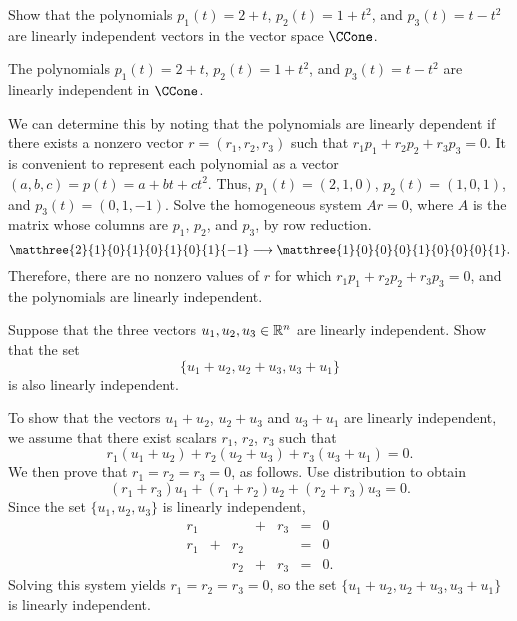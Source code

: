 \documentclass{article}
\begin{document}



\problemlabel

\begin{exercise} \label{c5.4.5}
Show that the polynomials $p_1(t) = 2+t$, $p_2(t) = 1+t^2$, and
$p_3(t) = t-t^2$ are linearly independent vectors in the vector
space $\CCone$.

\begin{solution}

\ans The polynomials $p_1(t) = 2 + t$, $p_2(t) = 1 + t^2$, and $p_3(t) =
t - t^2$ are linearly independent in $\CCone$.  

\soln We can determine this
by noting that the polynomials are linearly dependent if there exists
a nonzero vector $r = (r_1,r_2,r_3)$ such that $r_1p_1 + r_2p_2 +
r_3p_3 = 0$.  It is convenient to represent each polynomial as a
vector $(a,b,c) = p(t) = a + bt + ct^2$.  Thus, $p_1(t) = (2,1,0)$, 
$p_2(t) = (1,0,1)$, and $p_3(t) = (0,1,-1)$.  Solve the homogeneous
system $Ar = 0$, where $A$ is the matrix whose columns are $p_1$,
$p_2$, and $p_3$, by row reduction.
\[ \matthree{2}{1}{0}{1}{0}{1}{0}{1}{-1} \longrightarrow
\matthree{1}{0}{0}{0}{1}{0}{0}{0}{1}. \]
Therefore, there are no nonzero values of $r$ for which $r_1p_1 + 
r_2p_2 + r_3p_3 = 0$, and the polynomials are linearly independent.


\end{solution}
\end{exercise}





\problemlabel

\begin{exercise} \label{c5.4.7}
Suppose that the three vectors $u_1,u_2,u_3\in\mathbb R^n$ are linearly
independent.  Show that the set
\[
\{u_1+u_2, u_2+u_3,u_3+u_1\}
\]
is also linearly independent.

\begin{solution}

To show that the vectors $u_1 + u_2$, $u_2 + u_3$ and $u_3 + u_1$
are linearly independent, we assume that there exist scalars $r_1$,
$r_2$, $r_3$ such that
\[ r_1(u_1 + u_2) + r_2(u_2 + u_3) + r_3(u_3 + u_1) = 0. \]
We then prove that $r_1 = r_2 = r_3 = 0$, as follows.
Use distribution to obtain
\[ (r_1 + r_3)u_1 + (r_1 + r_2)u_2 + (r_2 + r_3)u_3 = 0. \]
Since the set $\{u_1,u_2,u_3\}$ is linearly independent,
\[ \begin{array}{rrrrrcl}
r_1 & & & + & r_3 & = & 0 \\
r_1 & + & r_2 & & & = & 0 \\
& & r_2 & + & r_3 & = & 0. \end{array} \]
Solving this system yields $r_1 = r_2 = r_3 = 0$,
so the set $\{u_1 + u_2,u_2 + u_3,u_3 + u_1\}$ is linearly
independent.

\end{solution}
\end{exercise}
\end{document}
